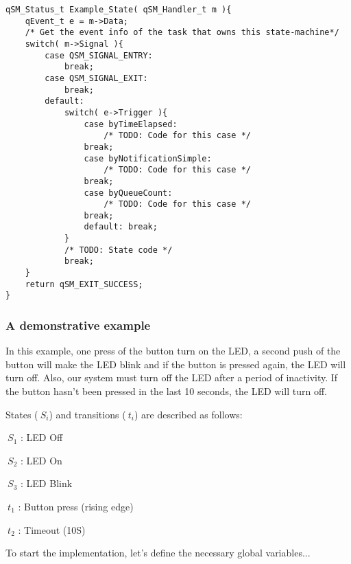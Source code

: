 \begin{lstlisting}[style=CStyle]
qSM_Status_t Example_State( qSM_Handler_t m ){
    qEvent_t e = m->Data; 
    /* Get the event info of the task that owns this state-machine*/
    switch( m->Signal ){
        case QSM_SIGNAL_ENTRY:
            break;
        case QSM_SIGNAL_EXIT:
            break;
        default:
            switch( e->Trigger ){
                case byTimeElapsed:
                    /* TODO: Code for this case */
                break;
                case byNotificationSimple:
                    /* TODO: Code for this case */
                break;
                case byQueueCount:
                    /* TODO: Code for this case */
                break;
                default: break;
            }
            /* TODO: State code */
            break;
    }
    return qSM_EXIT_SUCCESS;
}
\end{lstlisting}

\subsubsection{A demonstrative example} \label{fsm_example}
In this example, one press of the button turn on the LED, a second push of the button will make the LED blink and if the button is pressed again, the LED will turn off. Also, our system must turn off the LED after a period of inactivity. If the button hasn't been pressed in the last 10 seconds, the LED will turn off. 

States ($\ S_i$) and transitions ($\ t_i$) are described as follows: \\
\begin{itemize}
\begin{minipage}{0.4\linewidth}
    \item $\ S_1$ : LED Off
    \item $\ S_2$ : LED On
    \item $\ S_3$ : LED Blink
\end{minipage}
\begin{minipage}{0.4\linewidth}
    \item $\ t_1$ : Button press (rising edge)
    \item $\ t_2$ : Timeout (10S)
\end{minipage}
\end{itemize}



To start the implementation, let's define the necessary global variables...


